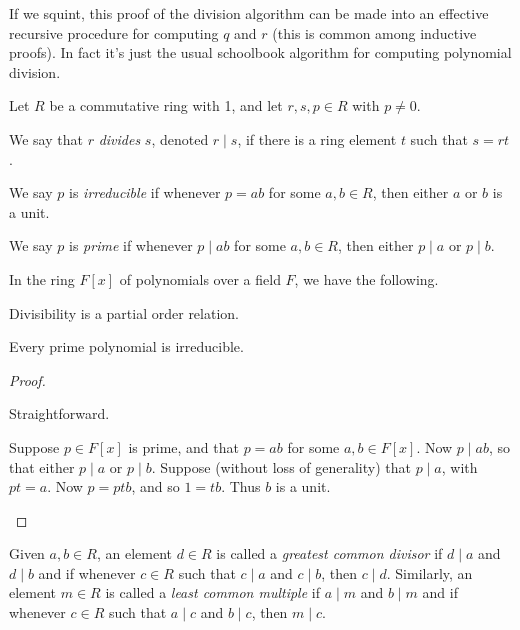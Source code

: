 \documentclass{memoir}
\begin{document}
If we squint, this proof of the division algorithm can be made into an effective recursive procedure for computing $q$ and $r$ (this is common among inductive proofs). In fact it's just the usual schoolbook algorithm for computing polynomial division.

\begin{dfn} Let $R$ be a commutative ring with 1, and let $r,s,p \in R$ with $p \neq 0$.
\begin{enumerate*}
\item We say that $r$ \emph{divides} $s$, denoted $r \mid s$, if there is a ring element $t$ such that $s = rt$.
\item We say $p$ is \emph{irreducible} if whenever $p = ab$ for some $a,b \in R$, then either $a$ or $b$ is a unit.
\item We say $p$ is \emph{prime} if whenever $p \mid ab$ for some $a,b \in R$, then either $p \mid a$ or $p \mid b$.
\end{enumerate*}
\end{dfn}

\begin{prp} In the ring $F[x]$ of polynomials over a field $F$, we have the following.
\begin{enumerate*}
\item Divisibility is a partial order relation.
\item Every prime polynomial is irreducible.
\end{enumerate*}
\end{prp}

\begin{proof} \mbox{}
\begin{enumerate*}
\item Straightforward.
\item Suppose $p \in F[x]$ is prime, and that $p = ab$ for some $a,b \in F[x]$. Now $p \mid ab$, so that either $p \mid a$ or $p \mid b$. Suppose (without loss of generality) that $p \mid a$, with $pt = a$. Now $p = ptb$, and so $1 = tb$. Thus $b$ is a unit. \qedhere
\end{enumerate*}
\end{proof}

\begin{dfn}
Given $a,b \in R$, an element $d \in R$ is called a \emph{greatest common divisor} if $d \mid a$ and $d \mid b$ and if whenever $c \in R$ such that $c \mid a$ and $c \mid b$, then $c \mid d$. Similarly, an element $m \in R$ is called a \emph{least common multiple} if $a \mid m$ and $b \mid m$ and if whenever $c \in R$ such that $a \mid c$ and $b \mid c$, then $m \mid c$.
\end{dfn}
\end{document}
